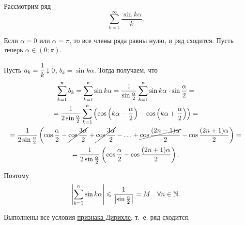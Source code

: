 \documentclass[../../main.tex]{subfiles}
\begin{document}
	\begin{example}
		Рассмотрим ряд
		\[\sum_{k = 1}^\infty\frac{\sin k\alpha}{k}.\]
		
		Если $\alpha = 0$ или $\alpha = \pi$, то все члены ряда равны нулю, 
		и ряд сходится. Пусть теперь $\alpha\in (0;\pi)$. 
		
		Пусть $a_k = \cfrac{1}{k}\downarrow 0$, $b_k = \sin k\alpha$. 
		Тогда получаем, что
		\begin{gather*}
			\sum_{k = 1}^n b_k = \sum_{k = 1}^n\sin k\alpha =
			\frac{1}{\sin\frac{\alpha}{2}}
			\sum_{k = 1}^n \sin k\alpha\cdot\sin\frac{\alpha}{2} = \\
			= \frac{1}{2\sin\frac{\alpha}{2}}
			\sum_{k = 1}^n\left(\cos\left(k\alpha - \frac{\alpha}{2}\right) - 
			\cos\left(k\alpha + \frac{\alpha}{2}\right)\right) = \\
			= \frac{1}{2\sin\frac{\alpha}{2}}\left(\cos\frac{\alpha}{2} - 
			\cancel{\cos\frac{3\alpha}{2}} + \cancel{\cos\frac{3\alpha}{2}} - 
			\ldots + \cancel{\cos\frac{(2n - 1)\alpha}{2}} - 
			\cos\frac{(2n + 1)\alpha}{2}\right) = \\
			= \frac{1}{2\sin\frac{\alpha}{2}}\left(\cos\frac{\alpha}{2} - 
			\cos\frac{(2n + 1)\alpha}{2}\right).
		\end{gather*}
		
		Поэтому
		\[\left|\sum_{k = 1}^n \sin k\alpha\right|\leqslant 
		\frac{1}{\left|\sin\frac{\alpha}{2}\right|} = M\quad \forall n \in \mathbb{N}.\]
		
		Выполнены все условия \hyperref[29:dirichle]{признака Дирихле}, т.~е. ряд 
		сходится.
	\end{example}
\end{document}

